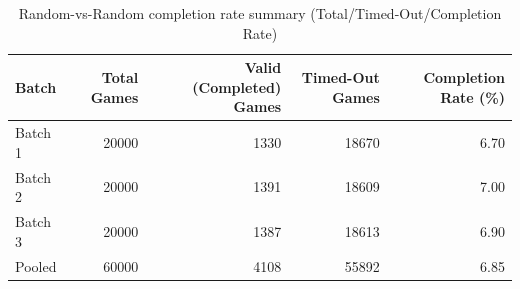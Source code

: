 \begin{table}[htbp]
\centering
\caption{Random-vs-Random completion rate summary (Total/Timed-Out/Completion Rate)}
\label{tab:random_completion}
\begin{tabular}{lrrrr}
\toprule
Batch & Total Games & Valid (Completed) Games & Timed-Out Games & Completion Rate (\%) \\
\midrule
Batch 1 & 20000 & 1330 & 18670 & 6.70 \\
Batch 2 & 20000 & 1391 & 18609 & 7.00 \\
Batch 3 & 20000 & 1387 & 18613 & 6.90 \\
Pooled & 60000 & 4108 & 55892 & 6.85 \\
\bottomrule
\end{tabular}
\end{table}